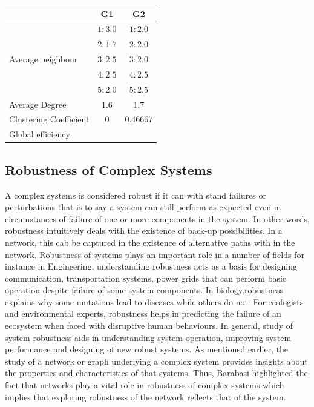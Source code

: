 \documentclass[10pt,a4paper]{article}
\begin{document}
\begin{table}[H]
	\centering
	\begin{tabular}{|l|c|c|}
		\hline
		&G1 & G2 \\
		\hline
		\multirow{5}{*}{Average neighbour} & $1:3.0$ & $1: 2.0$\\
		& $2: 1.7$& $2:2.0$\\
		& $3: 2.5$ & $3:2.0 $ \\
		& $4:2.5 $ & $4:2.5 $ \\ 
		& $5: 2.0$ & $5:2.5 $ \\
		\hline
		Average Degree & 1.6 & 1.7 \\
		\hline
		Clustering Coefficient & 0 &0.46667 \\
		\hline
		Global efficiency & & \\
		\hline
	\end{tabular}   
\end{table}


\subsection{Robustness of Complex Systems}
	A complex systems is considered robust if it can with stand failures or perturbations that is to say a system can still perform as expected even in circumstances of failure of one or more components in the system. 
	In other words, robustness intuitively deals with the existence of back-up possibilities. In a network, this cab be captured in the existence of alternative paths with in the network.
	 Robustness of systems plays an important role in a number of fields for instance in Engineering, understanding robustness acts as a basis for designing communication, transportation systems, power grids that can perform basic operation despite failure of some system components. In biology,robustness explains why some mutations lead to diseases while others do not. For ecologists and environmental experts, robustness helps in predicting the failure of an ecosystem when faced with disruptive human behaviours. In general, study of system robustness aids in understanding system operation, improving system performance and designing of new robust systems. 
	As mentioned earlier, the study of a network or graph underlying a complex system provides insights about the properties and characteristics of that systems. Thus, Barabasi \citep{barabasi2016network} highlighted the fact that networks play a vital role in robustness of complex systems which implies that exploring robustness of the network reflects that of the system.
	 
\end{document}
